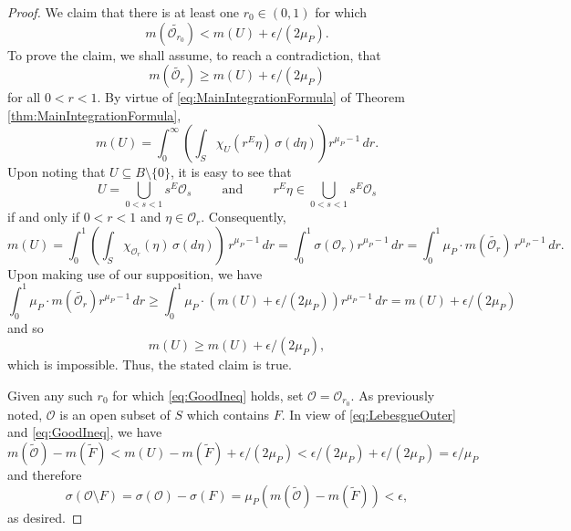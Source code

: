 \documentclass[11pt]{article}
\theoremstyle{remark}
\begin{document}
\begin{proof}
We claim that there is at least one $r_0\in (0,1)$ for which 
\begin{equation}\label{eq:GoodIneq}
m(\widetilde{\mathcal{O}_{r_0}})< m(U)+\epsilon/(2\mu_P).
\end{equation}
To prove the claim, we shall assume, to reach a contradiction, that 
\begin{equation*}
m(\widetilde{\mathcal{O}_{r}})\geq m(U)+\epsilon/(2\mu_P)
\end{equation*}
for all $0<r<1$. By virtue of \eqref{eq:MainIntegrationFormula} of Theorem \ref{thm:MainIntegrationFormula},
\begin{equation*}
m(U)=\int_{0}^\infty\left(\int_S \chi_{U}(r^E\eta)\,\sigma(d\eta)\right)r^{\mu_P-1}\,dr.
\end{equation*}
Upon noting that $U\subseteq B\setminus\{0\}$, it is easy to see that
\begin{equation*}
U=\bigcup_{0<s<1}s^E\mathcal{O}_s
\hspace{1cm}\mbox{and}\hspace{1cm}
r^E\eta\in \bigcup_{0<s<1}s^E\mathcal{O}_s
\end{equation*}
if and only if $0<r<1$ and $\eta\in \mathcal{O}_r$. Consequently,
\begin{equation*}
m(U)=\int_0^1\left(\int_S\chi_{\mathcal{O}_r}(\eta)\,\sigma(d\eta)\right)\,r^{\mu_P-1}\,dr=\int_0^1\sigma(\mathcal{O}_r)r^{\mu_P-1}\,dr=\int_0^1 \mu_P\cdot m(\widetilde{\mathcal{O}_r})\,r^{\mu_P-1}\,dr.
\end{equation*}
Upon making use of our supposition, we have
\begin{equation*}
\int_0^1\mu_P\cdot m(\widetilde{\mathcal{O}_r})r^{\mu_P-1}\,dr\geq \int_0^1\mu_P\cdot (m(U)+\epsilon/(2\mu_P))r^{\mu_P-1}\,dr=m(U)+\epsilon/(2\mu_P)
\end{equation*}
and so
\begin{equation*}
m(U)\geq m(U)+\epsilon/(2\mu_P),
\end{equation*}
which is impossible. Thus, the stated claim is true.

Given any such $r_0$ for which \eqref{eq:GoodIneq} holds, set $\mathcal{O}=\mathcal{O}_{r_0}$. As previously noted, $\mathcal{O}$ is an open subset of $S$ which contains $F$. In view of \eqref{eq:LebesgueOuter} and \eqref{eq:GoodIneq}, we have
\begin{equation*}
m(\widetilde{\mathcal{O}})-m(\widetilde{F})<m(U)-m(\widetilde{F})+\epsilon/(2\mu_P)<\epsilon/(2\mu_P)+\epsilon/(2\mu_P)=\epsilon/\mu_P
\end{equation*}
and therefore
\begin{equation*}
\sigma(\mathcal{O}\setminus F)=\sigma(\mathcal{O})-\sigma(F)=\mu_P(m(\widetilde{\mathcal{O}})-m(\widetilde{F}))<\epsilon,
\end{equation*}
as desired.
\end{proof}
\end{document}
